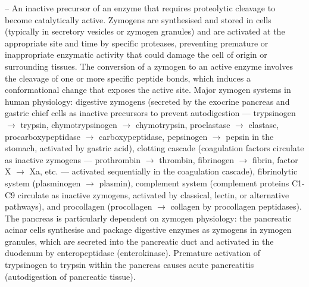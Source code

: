 -- An inactive precursor of an enzyme that requires proteolytic cleavage to become catalytically active. Zymogens are synthesised and stored in cells (typically in secretory vesicles or zymogen granules) and are activated at the appropriate site and time by specific proteases, preventing premature or inappropriate enzymatic activity that could damage the cell of origin or surrounding tissues. The conversion of a zymogen to an active enzyme involves the cleavage of one or more specific peptide bonds, which induces a conformational change that exposes the active site. Major zymogen systems in human physiology: digestive zymogens (secreted by the exocrine pancreas and gastric chief cells as inactive precursors to prevent autodigestion — trypsinogen $\rightarrow$ trypsin, chymotrypsinogen $\rightarrow$ chymotrypsin, proelastase $\rightarrow$ elastase, procarboxypeptidase $\rightarrow$ carboxypeptidase, pepsinogen $\rightarrow$ pepsin in the stomach, activated by gastric acid), clotting cascade (coagulation factors circulate as inactive zymogens — prothrombin $\rightarrow$ thrombin, fibrinogen $\rightarrow$ fibrin, factor X $\rightarrow$ Xa, etc. — activated sequentially in the coagulation cascade), fibrinolytic system (plasminogen $\rightarrow$ plasmin), complement system (complement proteins C1-C9 circulate as inactive zymogens, activated by classical, lectin, or alternative pathways), and procollagen (procollagen $\rightarrow$ collagen by procollagen peptidases). The pancreas is particularly dependent on zymogen physiology: the pancreatic acinar cells synthesise and package digestive enzymes as zymogens in zymogen granules, which are secreted into the pancreatic duct and activated in the duodenum by enteropeptidase (enterokinase). Premature activation of trypsinogen to trypsin within the pancreas causes acute pancreatitis (autodigestion of pancreatic tissue).
